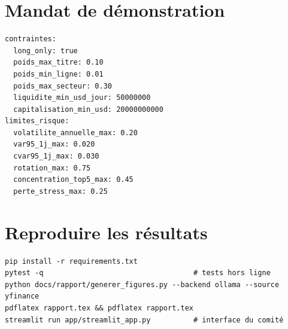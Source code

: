 \documentclass[11pt,a4paper]{report}
\begin{document}
\appendix
\chapter{Mandat de démonstration}
\begin{lstlisting}
contraintes:
  long_only: true
  poids_max_titre: 0.10
  poids_min_ligne: 0.01
  poids_max_secteur: 0.30
  liquidite_min_usd_jour: 50000000
  capitalisation_min_usd: 20000000000
limites_risque:
  volatilite_annuelle_max: 0.20
  var95_1j_max: 0.020
  cvar95_1j_max: 0.030
  rotation_max: 0.75
  concentration_top5_max: 0.45
  perte_stress_max: 0.25
\end{lstlisting}

\chapter{Reproduire les résultats}
\begin{lstlisting}
pip install -r requirements.txt
pytest -q                                   # tests hors ligne
python docs/rapport/generer_figures.py --backend ollama --source yfinance
pdflatex rapport.tex && pdflatex rapport.tex
streamlit run app/streamlit_app.py          # interface du comité
\end{lstlisting}
\end{document}

